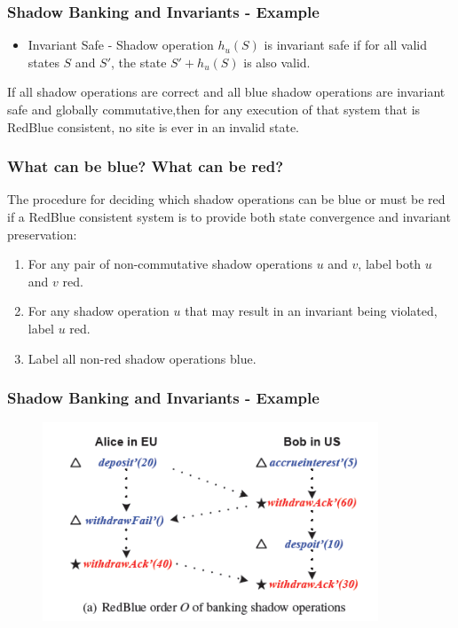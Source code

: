 \documentclass{beamer}
\begin{document}

\begin{frame}
\frametitle{Shadow Banking and Invariants - Example}
\begin{itemize}
\item Invariant Safe - Shadow operation $h_u(S)$ is invariant safe if for all valid states $S$ and $S'$, the state $S' + h_u(S)$ is also valid.
\end{itemize}
\begin{theorem}
If all shadow operations are correct and all blue shadow operations are invariant safe and globally commutative,then for any execution of that system that is RedBlue consistent, no site is ever in an invalid state.
\end{theorem}
\end{frame}


\begin{frame}
\frametitle{What can be blue? What can be red?}
The procedure for deciding which shadow operations can be blue or must be red if a RedBlue consistent system is to provide both state convergence and invariant preservation:
\begin{enumerate}
\item For any pair of non-commutative shadow operations $u$ and $v$, label both $u$ and $v$ red.
\item For any shadow operation $u$ that may result in an invariant being violated, label $u$ red.
\item Label all non-red shadow operations blue.
\end{enumerate}

\end{frame}


\begin{frame}
\frametitle{Shadow Banking and Invariants - Example}
\begin{figure}[t]
\includegraphics[width=10cm]{pic8.jpg}
\centering
\end{figure}

\end{frame}
\end{document}
